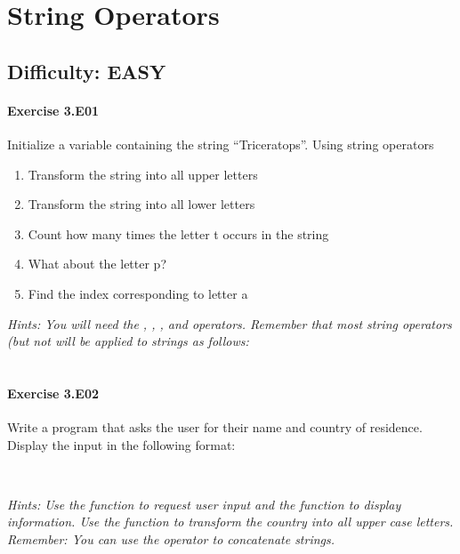 \chapter{String Operators}\label{CHAP_StringOperators}

\section{Difficulty: EASY}

\subsubsection*{Exercise 3.E01}
Initialize a variable containing the string “Triceratops”. Using string operators
\begin{enumerate}[label=(\alph*)]
	\item Transform the string into all upper letters
	\item Transform the string into all lower letters
	\item Count how many times the letter t occurs in the string
	\item What about the letter p?
	\item Find the index corresponding to letter a
\end{enumerate}


\textit{Hints:
You will need the {}, {}, {}, and {} operators. Remember that most string operators (but not {} will be applied to strings as follows:\\ {}}\\[1cm]




\subsubsection*{Exercise 3.E02}
Write a program that asks the user for their name and country of residence. Display the
input in the following format:
\begin{center}
	{}\\
\end{center}


\textit{Hints:
Use the {} function to request user input and the {} function to display information. Use the {} function to transform the country into all upper case letters. Remember: You can use the {\code{+}} operator to concatenate strings.}\\[1cm]



